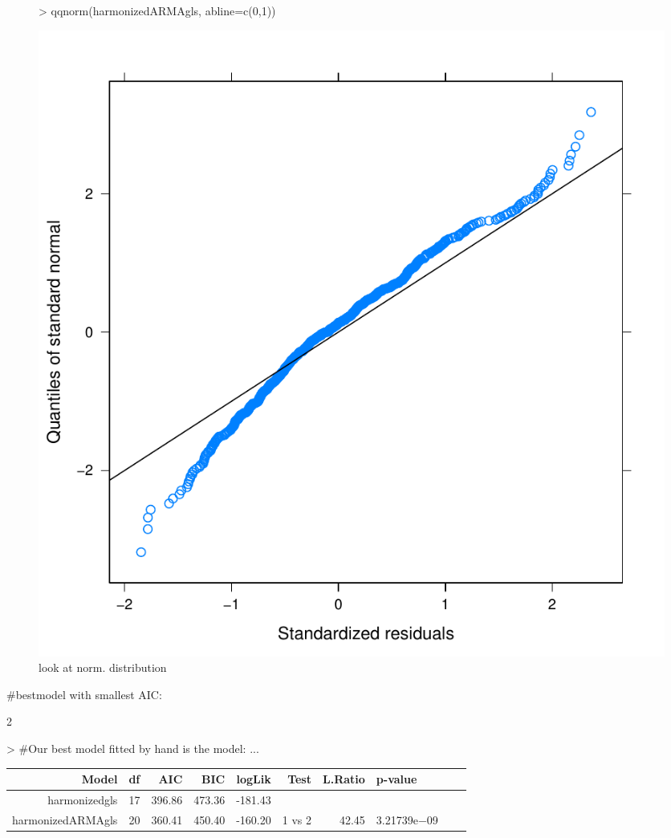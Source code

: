 \documentclass[11pt, a4paper]{article} %
\begin{document}
\begin{figure}[H]
\centering
\begin{Schunk}
\begin{Sinput}
> qqnorm(harmonizedARMAgls, abline=c(0,1))
\end{Sinput}
\end{Schunk}
\includegraphics{alleselena-047}
\caption{look at norm. distribution}
\label{finalgls_norm}
\end{figure}

\linebreak
#bestmodel with smallest AIC: \\
\begin{Schunk}
\begin{Soutput}
[1] 2
\end{Soutput}
\begin{Sinput}
> #Our best model fitted by hand is the model:  ...
\end{Sinput}
\end{Schunk}

\begin{table}[ht]
\centering
\begin{tabular}{rlrrrrrlrr}
  \hline
 Model & df & AIC & BIC & logLik & Test & L.Ratio & p-value \\ 
  \hline
harmonizedgls  &    17 & 396.86 & 473.36 & -181.43 &  &  &  \\ 
  harmonizedARMAgls  &    20 & 360.41 & 450.40 & -160.20 & 1 vs 2 & 42.45 & 3.21739e$-$09 \\ 
   \hline
\end{tabular}
\end{table}
\end{document}
